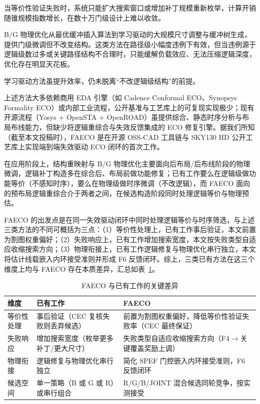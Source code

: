 \documentclass[journal]{IEEEtran}
\begin{document}
当等价性验证失败时，系统只能扩大搜索窗口或增加补丁规模重新枚举\cite{zhuo2018patch}，计算开销随锥规模指数增长，在数十万门级设计上难以收敛。

B/G 物理优化从最优缓冲插入算法\cite{liang2012buffer}到学习驱动的大规模尺寸调整与缓冲树生成\cite{liu2021rlsizer,huang2025phys,chen2024aito,zhang2025buffalo}，提供门级微调但不改变结构。这类方法在路径级小幅度违例下有效，但当违例源于逻辑级数过多或关键路径结构不合理时，只能缓解负载效应、无法压缩逻辑深度，优化存在明显天花板\cite{liu2021rlsizer,huang2025phys}。

学习驱动方法\cite{chen2024aito,zhang2025buffalo}虽提升效率，仍未脱离“不改逻辑级结构”的前提。

上述方法大多依赖商用 EDA 引擎（如 Cadence Conformal ECO、Synopsys Formality ECO）或内部工业流程，公开基准与工艺库上的可复现实现极少；现有开源流程（Yosys + OpenSTA + OpenROAD）虽提供综合、静态时序分析与布局布线能力，但缺少将逻辑重综合与失效反馈集成的 ECO 修复引擎。据我们所知（截至本文投稿时），FAECO 是在开源 OSS-CAD 工具链与 SKY130 HD 公开工艺库上实现端到端失效驱动 ECO 闭环的首次工作。

在应用阶段上，结构重映射与 B/G 物理优化主要面向后布局/后布线阶段的物理微调，逻辑补丁构造多在综合后、布局前做功能修复；已有工作要么在逻辑级做功能等价（不感知时序），要么在物理级做时序微调（不改逻辑），而 FAECO 面向的预布局逻辑重综合介于两者之间，在候选构造阶段同时处理逻辑等价与物理预估。

FAECO 的出发点是在同一失效驱动闭环中同时处理逻辑等价与时序筛选，与上述三类方法的不同可概括为三点：（1）等价性处理上，已有工作事后验证，本文前置为割图权重偏好；（2）失败响应上，已有工作增加搜索宽度，本文按失败类型自适应收缩搜索方向；（3）物理衔接上，已有工作逻辑修复与物理优化串行独立，本文将估计线载嵌入内环接受准则并形成 F6 反馈闭环。综上，三类已有方法在这三个维度上均与 FAECO 存在本质差异，汇总如表~\ref{tab:related_diff}。

\begin{table}[!t]
\centering
\caption{FAECO 与已有工作的关键差异}
\label{tab:related_diff}
\footnotesize
\setlength{\tabcolsep}{3pt}
\begin{tabular}{p{2.2cm}p{2.8cm}p{3.2cm}}
\toprule
\textbf{维度} & \textbf{已有工作} & \textbf{FAECO} \\
\midrule
等价性处理 & 事后验证（CEC 复核失败则丢弃候选） & 前置为割图权重偏好，降低等价性验证失败率（CEC 最终保证） \\
失败响应 & 增加搜索宽度（枚举更多补丁/更大尺寸） & 失败类型自适应收缩搜索方向（F4$\to$关键覆盖奖励上调） \\
物理衔接 & 逻辑修复与物理优化串行独立 & 简化 SPEF 门控嵌入内环接受准则，F6 反馈闭环 \\
候选空间 & 单一策略（B 或 G 或 R）或串行组合 & R/G/B/JOINT 混合候选同轮竞争，按实测接受 \\
\bottomrule
\end{tabular}
\end{table}
\end{document}
